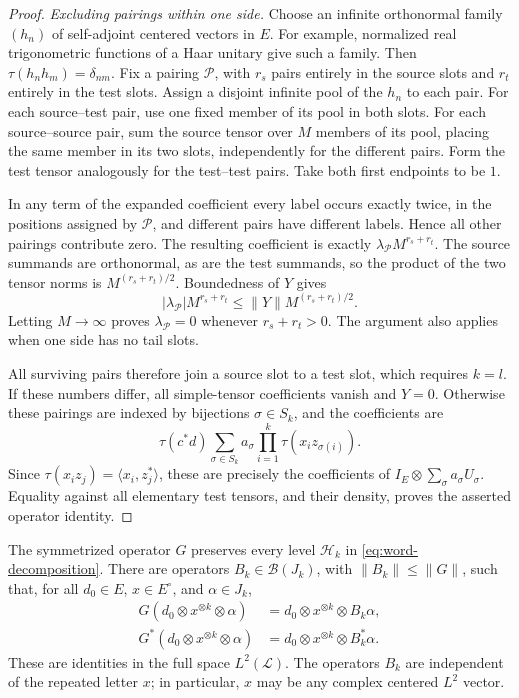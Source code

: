 \begin{proof}
\smallskip\noindent
\emph{Excluding pairings within one side.}
Choose an infinite orthonormal family $(h_n)$ of self-adjoint
centered vectors in $E$.  For example, normalized real
trigonometric functions of a Haar unitary give such a family.
Then $\tau(h_nh_m)=\delta_{nm}$.
Fix a pairing $\mathcal P$, with $r_s$ pairs entirely in the source
slots and $r_t$ entirely in the test slots.  Assign a disjoint
infinite pool of the $h_n$ to each pair.  For each source--test pair,
use one fixed member of its pool in both slots.  For each
source--source pair, sum the source tensor over $M$ members of its
pool, placing the same member in its two slots, independently for
the different pairs.  Form the test tensor analogously for the
test--test pairs.  Take both first endpoints to be $1$.

In any term of the expanded coefficient every label occurs exactly
twice, in the positions assigned by $\mathcal P$, and different
pairs have different labels.  Hence all other pairings contribute
zero.  The resulting coefficient is exactly
$\lambda_{\mathcal P}M^{r_s+r_t}$.  The source summands are
orthonormal, as are the test summands, so the product of the two
tensor norms is $M^{(r_s+r_t)/2}$.  Boundedness of $Y$ gives
\[
 |\lambda_{\mathcal P}|M^{r_s+r_t}
       \leq\|Y\|M^{(r_s+r_t)/2}.
\]
Letting $M\to\infty$ proves $\lambda_{\mathcal P}=0$ whenever
$r_s+r_t>0$.  The argument also applies when one side has no tail
slots.

All surviving pairs therefore join a source slot to a test slot,
which requires $k=l$.  If these numbers differ, all simple-tensor
coefficients vanish and $Y=0$.  Otherwise these pairings are
indexed by bijections $\sigma\in S_k$, and the coefficients are
\[
 \tau(c^*d)\sum_{\sigma\in S_k}a_\sigma
       \prod_{i=1}^k\tau(x_i z_{\sigma(i)}).
\]
Since $\tau(x_i z_j)=\langle x_i,z_j^*\rangle$, these are precisely
the coefficients of
$I_E\otimes\sum_\sigma a_\sigma U_\sigma$.  Equality against all
elementary test tensors, and their density, proves the asserted
operator identity.
\end{proof}

\begin{lemma}\label{lem:word-structure}
The symmetrized operator $G$ preserves every level $\mathcal H_k$
in \eqref{eq:word-decomposition}.  There are operators
$B_k\in\mathcal B(J_k)$, with $\|B_k\|\leq\|G\|$, such that, for
all $d_0\in E$, $x\in E^\circ$, and $\alpha\in J_k$,
\begin{equation}\label{eq:repeated-letter}
 \begin{aligned}
 G(d_0\otimes x^{\otimes k}\otimes\alpha)
     &=d_0\otimes x^{\otimes k}\otimes B_k\alpha,\\
 G^*(d_0\otimes x^{\otimes k}\otimes\alpha)
     &=d_0\otimes x^{\otimes k}\otimes B_k^*\alpha.
 \end{aligned}
\end{equation}
These are identities in the full space $L^2(\mathcal L)$.
The operators $B_k$ are independent of the repeated letter $x$;
in particular, $x$ may be any complex centered $L^2$ vector.
\end{lemma}

